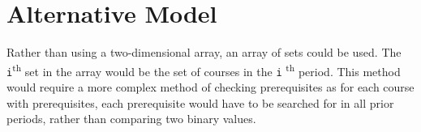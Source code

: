 \documentclass[11pt]{article}
\begin{document}
    \section{Alternative Model}\label{sec:alternative-model}
    Rather than using a two-dimensional array, an array of sets could be used.
    The \texttt{i}\textsuperscript{th} set in the array would be the set of courses in the \texttt{i}
    \textsuperscript{th} period.
    This method would require a more complex method of checking prerequisites as for each course with prerequisites,
    each prerequisite would have to be searched for in all prior periods, rather than comparing two binary values.
\end{document}
